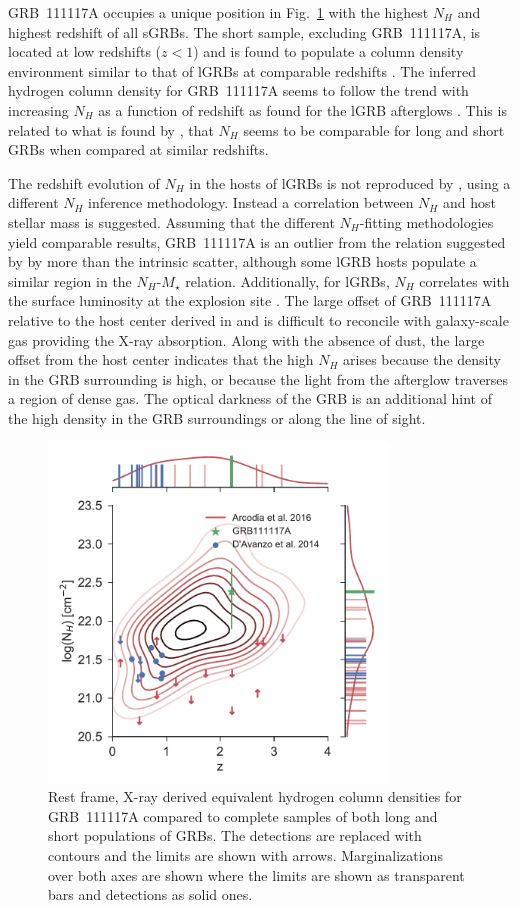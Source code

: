\documentclass{aa}    %
\begin{document}
GRB~111117A occupies a unique position in Fig.~\ref{fig:NH_z} with the highest
$N_H$ and highest redshift of all sGRBs. The short sample, excluding
GRB~111117A, is located at low redshifts ($z < 1$) and is found to populate a
column density environment similar to that of lGRBs at comparable redshifts
\citep{DAvanzo2014a}. The inferred hydrogen column density for GRB~111117A seems
to follow the trend with increasing $N_H$ as a function of redshift as found for
the lGRB afterglows \citep{Campana2010, Starling2013, Arcodia2016}. This is
related to what is found by \citet{Kopac2012, Margutti2013}, that $N_H$ seems to
be comparable for long and short GRBs when compared at similar redshifts.

The redshift evolution of $N_H$ in the hosts of lGRBs is not reproduced by
\citet{Buchner2017}, using a different $N_H$ inference methodology. Instead a
correlation between $N_H$ and host stellar mass is suggested. Assuming that the
different $N_H$-fitting methodologies yield comparable results, GRB~111117A is
an outlier from the relation suggested by \citet{Buchner2017} by more than the
intrinsic scatter, although some lGRB hosts populate a similar region in the
$N_H$-$M_\star$ relation. Additionally, for lGRBs, $N_H$ correlates with the
surface luminosity at the explosion site \citep{Lyman2017}. The large offset of
GRB~111117A relative to the host center derived in \citet{Margutti2012} and
\citet{Sakamoto2013} is difficult to reconcile with galaxy-scale gas providing
the X-ray absorption. Along with the absence of dust, the large offset from the
host center indicates that the high $N_H$ arises because the density in the GRB
surrounding is high, or because the light from the afterglow traverses a region
of dense gas. The optical darkness of the GRB is an additional hint of the high
density in the GRB surroundings or along the line of sight.

\begin{figure}
	\centering
	\includegraphics[width=9cm]{figures/NH_z.pdf}
	\caption{Rest frame, X-ray derived equivalent hydrogen column densities for GRB~111117A compared to complete samples of both long and short populations of GRBs. The detections are replaced with contours and the limits are shown with arrows. Marginalizations over both axes are shown where the limits are shown as transparent bars and detections as solid ones.}
	\label{fig:NH_z}
\end{figure}
\end{document}
